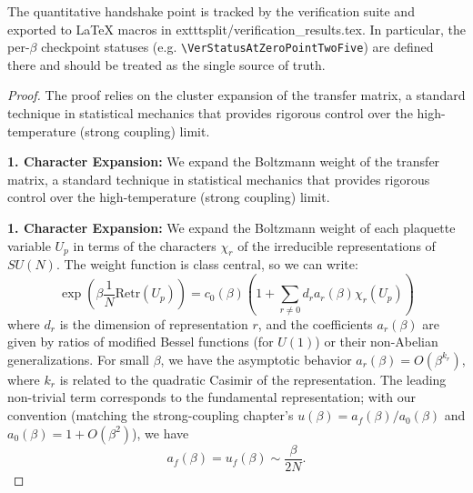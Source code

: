 \begin{remark}
The quantitative handshake point is tracked by the verification suite and exported to LaTeX macros in
    	exttt{split/verification\_results.tex}.
In particular, the per-$\beta$ checkpoint statuses (e.g. \texttt{\textbackslash VerStatusAtZeroPointTwoFive}) are defined there and should be treated as the single source of truth.
\end{remark}

\begin{proof}
The proof relies on the cluster expansion of the transfer matrix, a standard technique in statistical mechanics that provides rigorous control over the high-temperature (strong coupling) limit.

\textbf{1. Character Expansion:}
We expand the Boltzmann weight of the transfer matrix, a standard technique in statistical mechanics that provides rigorous control over the high-temperature (strong coupling) limit.

\textbf{1. Character Expansion:}
We expand the Boltzmann weight of each plaquette variable $U_p$ in terms of the characters $\chi_r$ of the irreducible representations of $SU(N)$. The weight function is class central, so we can write:
\begin{equation}
\exp\left(\beta \frac{1}{N} \text{Re} \text{tr}(U_p)\right) = c_0(\beta) \left( 1 + \sum_{r \neq 0} d_r a_r(\beta) \chi_r(U_p) \right)
\label{eq:dbg-sc-character-expansion}
\end{equation}
where $d_r$ is the dimension of representation $r$, and the coefficients $a_r(\beta)$ are given by ratios of modified Bessel functions (for $U(1)$) or their non-Abelian generalizations. For small $\beta$, we have the asymptotic behavior $a_r(\beta) = O(\beta^{k_r})$, where $k_r$ is related to the quadratic Casimir of the representation. The leading non-trivial term corresponds to the fundamental representation; with our convention (matching the strong-coupling chapter's $u(\beta)=a_f(\beta)/a_0(\beta)$ and $a_0(\beta)=1+O(\beta^2)$), we have
\begin{equation}
    a_f(\beta) = u_f(\beta) \sim \frac{\beta}{2N}.
    \label{eq:dbg-sc-uf-asymptotic}
\end{equation}


\end{proof}
